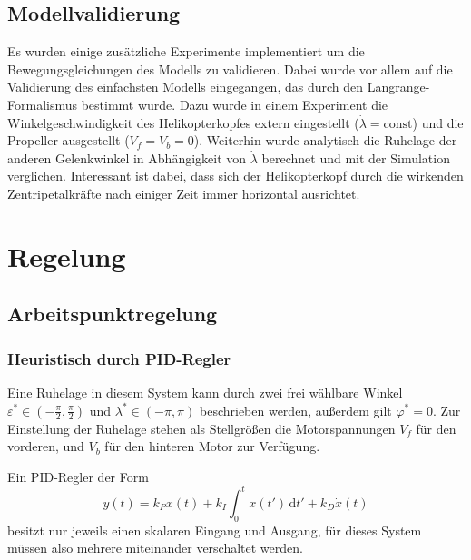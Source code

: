 \documentclass[10pt,twocolumn]{article}
\begin{document}
	\subsection{Modellvalidierung}
	
	Es wurden einige zusätzliche Experimente implementiert um die Bewegungsgleichungen des Modells zu validieren. Dabei wurde vor allem auf die Validierung des einfachsten Modells eingegangen, das durch den Langrange-Formalismus bestimmt wurde.
	Dazu wurde in einem Experiment die Winkelgeschwindigkeit des Helikopterkopfes extern eingestellt ($\dot{\lambda} = \mathrm{const}$) und die Propeller ausgestellt ($V_f = V_b = 0$).
	Weiterhin wurde analytisch die Ruhelage der anderen Gelenkwinkel in Abhängigkeit von $\dot{\lambda}$ berechnet und mit der Simulation verglichen.
	Interessant ist dabei, dass sich der Helikopterkopf durch die wirkenden Zentripetalkräfte nach einiger Zeit immer horizontal ausrichtet.
	
	\section{Regelung}
	\subsection{Arbeitspunktregelung}
	\subsubsection{Heuristisch durch PID-Regler}
	Eine Ruhelage in diesem System kann durch zwei frei wählbare Winkel \(\varepsilon^* \in (-\frac{\pi}{2}, \frac{\pi}{2})\) und \(\lambda^* \in (-\pi, \pi)\) beschrieben werden, außerdem gilt \(\varphi^*=0\).
	Zur Einstellung der Ruhelage stehen als Stellgrößen die Motorspannungen \(V_f\) für den vorderen, und \(V_b\) für den hinteren Motor zur Verfügung.
	
	Ein PID-Regler der Form
	\[
	y(t) = k_P x(t) + k_I \int_0^t x(t') \, \mathrm{d}t' +  k_D \dot{x}(t)
	\]
	besitzt nur jeweils einen skalaren Eingang und Ausgang, für dieses System müssen also mehrere miteinander verschaltet werden.
	
\end{document}
